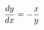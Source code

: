 \documentclass[preview]{standalone}
\begin{document}
\begin{align*}
{dy \over dx} = -{x \over y}
\end{align*}
\end{document}
